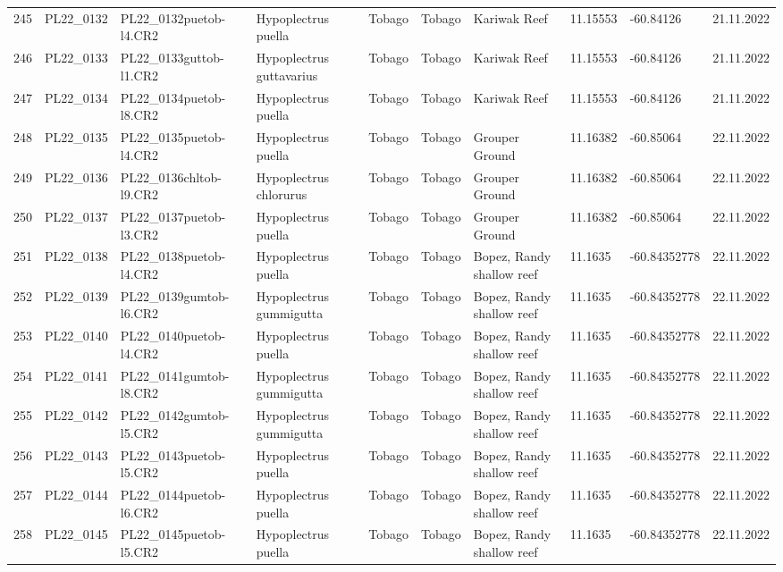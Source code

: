 \begin{table}[ht]
\begin{tabular}{rlllllllll}
  245 & PL22\_0132 & PL22\_0132puetob-l4.CR2 & Hypoplectrus puella & Tobago & Tobago & Kariwak Reef & 11.15553 & -60.84126 & 21.11.2022 \\ 
  246 & PL22\_0133 & PL22\_0133guttob-l1.CR2 & Hypoplectrus guttavarius & Tobago & Tobago & Kariwak Reef & 11.15553 & -60.84126 & 21.11.2022 \\ 
  247 & PL22\_0134 & PL22\_0134puetob-l8.CR2 & Hypoplectrus puella & Tobago & Tobago & Kariwak Reef & 11.15553 & -60.84126 & 21.11.2022 \\ 
  248 & PL22\_0135 & PL22\_0135puetob-l4.CR2 & Hypoplectrus puella & Tobago & Tobago & Grouper Ground & 11.16382 & -60.85064 & 22.11.2022 \\ 
  249 & PL22\_0136 & PL22\_0136chltob-l9.CR2 & Hypoplectrus chlorurus & Tobago & Tobago & Grouper Ground & 11.16382 & -60.85064 & 22.11.2022 \\ 
  250 & PL22\_0137 & PL22\_0137puetob-l3.CR2 & Hypoplectrus puella & Tobago & Tobago & Grouper Ground & 11.16382 & -60.85064 & 22.11.2022 \\ 
  251 & PL22\_0138 & PL22\_0138puetob-l4.CR2 & Hypoplectrus puella & Tobago & Tobago & Bopez, Randy shallow reef & 11.1635 & -60.84352778 & 22.11.2022 \\ 
  252 & PL22\_0139 & PL22\_0139gumtob-l6.CR2 & Hypoplectrus gummigutta & Tobago & Tobago & Bopez, Randy shallow reef & 11.1635 & -60.84352778 & 22.11.2022 \\ 
  253 & PL22\_0140 & PL22\_0140puetob-l4.CR2 & Hypoplectrus puella & Tobago & Tobago & Bopez, Randy shallow reef & 11.1635 & -60.84352778 & 22.11.2022 \\ 
  254 & PL22\_0141 & PL22\_0141gumtob-l8.CR2 & Hypoplectrus gummigutta & Tobago & Tobago & Bopez, Randy shallow reef & 11.1635 & -60.84352778 & 22.11.2022 \\ 
  255 & PL22\_0142 & PL22\_0142gumtob-l5.CR2 & Hypoplectrus gummigutta & Tobago & Tobago & Bopez, Randy shallow reef & 11.1635 & -60.84352778 & 22.11.2022 \\ 
  256 & PL22\_0143 & PL22\_0143puetob-l5.CR2 & Hypoplectrus puella & Tobago & Tobago & Bopez, Randy shallow reef & 11.1635 & -60.84352778 & 22.11.2022 \\ 
  257 & PL22\_0144 & PL22\_0144puetob-l6.CR2 & Hypoplectrus puella & Tobago & Tobago & Bopez, Randy shallow reef & 11.1635 & -60.84352778 & 22.11.2022 \\ 
  258 & PL22\_0145 & PL22\_0145puetob-l5.CR2 & Hypoplectrus puella & Tobago & Tobago & Bopez, Randy shallow reef & 11.1635 & -60.84352778 & 22.11.2022 \\ 

\end{tabular}
\end{table}
